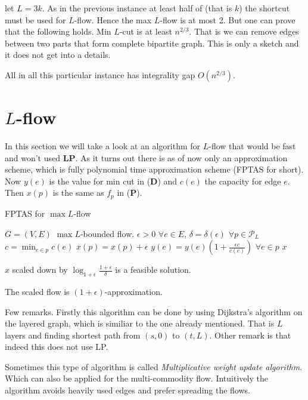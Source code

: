 let $L = 3k$. As in the previous instance at least half of (that is $k$) the shortcut must be used for $L$-flow. Hence the max $L$-flow is at most 2. But one can prove that the following holds. Min $L$-cut is at least $n^{2/3}$. That is we can remove edges between two parts that form complete bipartite graph. This is only a sketch and it does not get into a details.

All in all this particular instance has integrality gap $O(n^{2/3})$.

\section{$L$-flow}

In this section we will take a look at an algorithm for $L$-flow that would be fast and won't used \textbf{LP}. As it turns out there is as of now only an approximation scheme, which is fully polynomial time approximation scheme (FPTAS for short). Now $y(e)$ is the value for min cut in (\textbf{D}) and $c(e)$ the capacity for edge $e$. Then $x(p)$ is the same as $f_p$ in (\textbf{P}).

\begin{algorithm}
	\caption{FPTAS for $\max L$-flow}
	\begin{algorithmic}[1]
		\Require $G = (V,E)$
		\Ensure $\max L$-bounded flow.
		\State $\epsilon > 0$ $\forall e \in E$, $\delta = \delta(\epsilon)$ $\forall p \in \mathcal{P}_L$
			\State $c = \min_{e \in p} c(e)$
			\State $x(p) = x(p) + \epsilon$
			\State $y(e) = y(e) \left( 1 + \frac{\epsilon c}{c(e)} \right)$ $\forall e \in p$
		\EndWhile
		\State \Return $x$
	\end{algorithmic}
\end{algorithm}

\begin{lemma}
	$x$ scaled down by $\log_{1 + \epsilon} \frac{1+\epsilon}{\delta}$ is a feasible solution.
\end{lemma}

\begin{thm}
	The scaled flow is $(1 + \epsilon)$-approximation.
\end{thm}

Few remarks. Firstly this algorithm can be done by using Dijkstra's algorithm on the layered graph, which is similiar to the one already mentioned. That is $L$ layers and finding shortest path from $(s,0)$ to $(t, L)$. Other remark is that indeed this does not use LP.

Sometimes this type of algorithm is called \textit{Multiplicative weight update algorithm}. Which can also be applied for the multi-commodity flow. Intuitively the algorithm avoids heavily used edges and prefer spreading the flows.